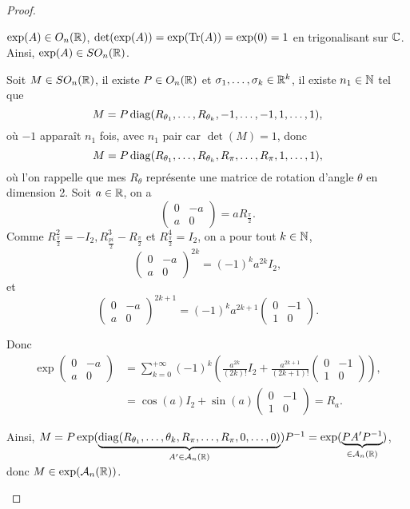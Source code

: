 \documentclass[12pt]{article}
\begin{document}
\begin{proof}
\begin{enumerate}
		$\exp(A)\in O_n(\mathbb{R})$, $\det(\exp(A))=\exp(\operatorname{Tr}(A))=\exp(0)=1$ en trigonalisant sur $\mathbb{C}$. Ainsi, $\exp(A)\in SO_n(\mathbb{R})$.

		Soit $M\in SO_{n}(\mathbb{R})$, il existe $P\in O_n(\mathbb{R})$ et $\sigma_1,\dots,\sigma_k\in\mathbb{R}^{k}$, il existe $n_1\in\mathbb{N}$ tel que 
		\begin{equation}
			M=P\operatorname{diag}(R_{\theta_1},\dots,R_{\theta_k},-1,\dots,-1,1,\dots,1),
		\end{equation}
		où $-1$ apparaît $n_1$ fois, avec $n_1$ pair car $\det(M)=1$, donc 
		\begin{equation}
			M=P\operatorname{diag}(R_{\theta_1},\dots,R_{\theta_k},R_{\pi},\dots,R_{\pi},1,\dots,1),
		\end{equation}
		où l'on rappelle que mes $R_{\theta}$ représente une matrice de rotation d'angle $\theta$ en dimension 2. Soit $a\in\mathbb{R}$, on a 
		\begin{equation}
			\begin{pmatrix}
				0&-a\\a&0
			\end{pmatrix}=aR_{\frac{\pi}{2}}.
		\end{equation}
		Comme $R_{\frac{\pi}{2}}^{2}=-I_2, R_{\frac{pi}{2}}^{3}-R_{\frac{\pi}{2}}$ et $R_{\frac{\pi}{2}}^{4}=I_2$, on a pour tout $k\in\mathbb{N}$,
		\begin{equation}
			\begin{pmatrix}
				0&-a\\a&0
			\end{pmatrix}^{2k}=(-1)^{k}a^{2k}I_2,
		\end{equation}
		et
		\begin{equation}
			\begin{pmatrix}
				0&-a\\a&0
			\end{pmatrix}^{2k+1}=(-1)^{k}a^{2k+1}\begin{pmatrix}
				0&-1\\1&0
			\end{pmatrix}.
		\end{equation}

		Donc 
		\begin{align}
			\exp\begin{pmatrix}
				0&-a\\a&0
			\end{pmatrix}
			&=\sum_{k=0}^{+\infty}(-1)^{k}\left(\frac{a^{2k}}{(2k)!}I_2+\frac{a^{2k+1}}{(2k+1)!}\begin{pmatrix}
				0&-1\\1&0
			\end{pmatrix}\right),\\
			&=\cos(a)I_2+\sin(a)\begin{pmatrix}
				0&-1\\1&0
			\end{pmatrix}=R_a.
		\end{align}

		Ainsi, $M=P\exp(\underbrace{\operatorname{diag}(R_{\theta_1},\dots,\theta_k,R_\pi,\dots,R_\pi,0,\dots,0)}_{A'\in\mathcal{A}_n(\mathbb{R})})P^{-1}=\exp(\underbrace{PA'P^{-1}}_{\in \mathcal{A}_n(\mathbb{R})})$, donc $M\in\exp(\mathcal{A}_n(\mathbb{R}))$.
	\end{enumerate}
\end{proof}
\end{document}
